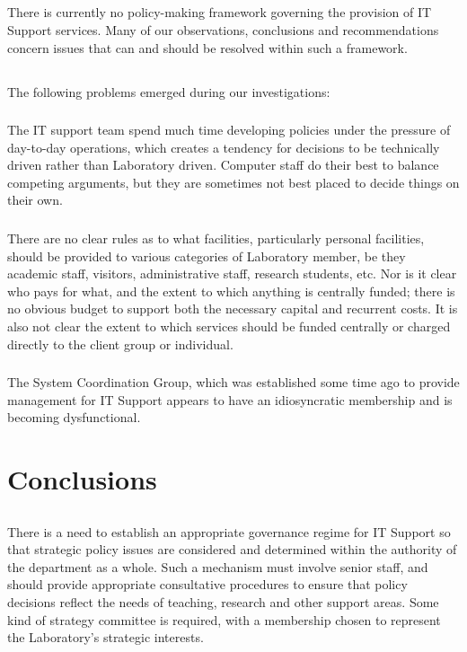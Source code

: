 \documentclass{article}
\begin{document}
\subsection{}
There is currently no policy-making framework governing the provision of IT Support services. Many of our observations, conclusions and recommendations concern issues that can and should be resolved within such a framework.

\subsection{}
The following problems emerged during our investigations:

\subsubsection{}
The IT support team spend much time developing policies under the pressure of day-to-day operations, which creates a tendency for decisions to be technically driven rather than Laboratory driven. Computer staff do their best to balance competing arguments, but they are sometimes not best placed to decide things on their own.

\subsubsection{}
There are no clear rules as to what facilities, particularly personal facilities, should be provided to various categories of Laboratory member, be they academic staff, visitors, administrative staff, research students, etc. Nor is it clear who pays for what, and the extent to which anything is centrally funded; there is no obvious budget to support both the necessary capital and recurrent costs. It is also not clear the extent to which services should be funded centrally or charged directly to the client group or individual.

\subsubsection{}
The System Coordination Group, which was established some time ago to provide management for IT Support appears to have an idiosyncratic membership and is becoming dysfunctional.

\section{Conclusions}
\subsection{}
There is a need to establish an appropriate governance regime for IT Support so that strategic policy issues are considered and determined within the authority of the department as a whole. Such a mechanism must involve senior staff, and should provide appropriate consultative procedures to ensure that policy decisions reflect the needs of teaching, research and other support areas. Some kind of strategy committee is required, with a membership chosen to represent the Laboratory’s strategic interests.
\end{document}
